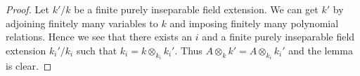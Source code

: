 \documentclass[10pt,a4paper]{amsart}
\theoremstyle{plain}
\theoremstyle{definition}
\theoremstyle{remark}
\numberwithin{equation}{subsection}
\begin{document}
\begin{proof}
Let $k'/k$ be a finite purely inseparable field extension.
We can get $k'$ by adjoining finitely many variables to $k$ and
imposing finitely many polynomial relations. Hence we see that
there exists an $i$ and a finite purely inseparable field extension
$k_i'/k_i$ such that $k_i = k \otimes_{k_i} k_i'$.
Thus $A \otimes_k k' = A \otimes_{k_i} k_i'$ and the lemma is clear.
\end{proof}
\end{document}

